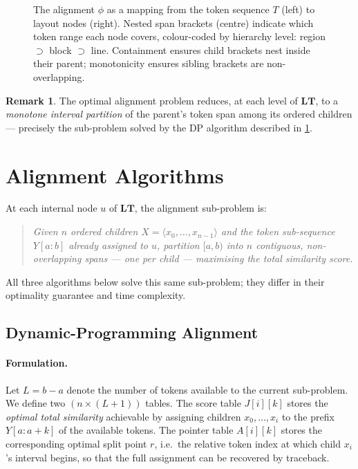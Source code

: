 \documentclass{article}
\theoremstyle{definition}
\newtheorem{remark}{Remark}[section]
\newcommand{\LT}{\mathbf{LT}}
\begin{document}
\begin{figure}[h]
\begin{tikzpicture}
  \end{tikzpicture}
  \caption{The alignment $\phi$ as a mapping from the token sequence $T$
    (left) to layout nodes (right).  Nested span brackets (centre) indicate
    which token range each node covers, colour-coded by hierarchy level:
    \textcolor{blue!70!black}{region} $\supset$
    \textcolor{green!60!black}{block} $\supset$
    \textcolor{orange!80!black}{line}.
    Containment ensures child brackets nest inside their parent; monotonicity
    ensures sibling brackets are non-overlapping.}
  \label{fig:alignment}
\end{figure}

\begin{remark}
  The optimal alignment problem reduces, at each level of $\LT$, to a
  \emph{monotone interval partition} of the parent's token span among its
  ordered children --- precisely the sub-problem solved by the DP algorithm
  described in \cref{sec:algo}.
\end{remark}

\section{Alignment Algorithms}
\label{sec:algo}

At each internal node $u$ of $\LT$, the alignment sub-problem is:
\begin{quote}
  \emph{Given $n$ ordered children $X = \langle x_0, \ldots, x_{n-1} \rangle$
  and the token sub-sequence $Y[a:b]$ already assigned to $u$, partition
  $[a, b)$ into $n$ contiguous, non-overlapping spans --- one per child ---
  maximising the total similarity score.}
\end{quote}
\noindent All three algorithms below solve this same sub-problem; they differ in
their optimality guarantee and time complexity.

\subsection{Dynamic-Programming Alignment}
\label{sec:dp}

\paragraph{Formulation.}
Let $L = b - a$ denote the number of tokens available to the current
sub-problem.  We define two $(n \times (L{+}1))$ tables.  The score table
$J[i][k]$ stores the \emph{optimal total similarity} achievable by assigning
children $x_0, \ldots, x_i$ to the prefix $Y[a : a{+}k]$ of the available
tokens.  The pointer table $A[i][k]$ stores the corresponding optimal split
point $r$, i.e.\ the relative token index at which child $x_i$'s interval
begins, so that the full assignment can be recovered by traceback.
\end{document}
